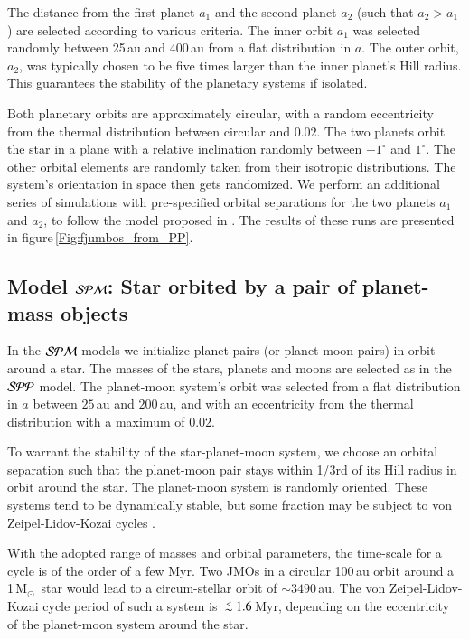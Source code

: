 \documentclass[submission,phys]{lib/SciPost}
\newcommand{\MSun}{\mbox{$\mathrm{{M}}_\odot$}}
\def\aplt{\ {\raise-.5ex\hbox{$\buildrel<\over\sim$}}\ }
\begin{document}
The distance from the first
planet $a_1$ and the second planet $a_2$ (such that $a_2>a_1$) are
selected according to various criteria.  The inner orbit $a_1$ was
selected randomly between 25\,au and $400$\,au from a flat
distribution in $a$.  The outer orbit, $a_2$, was typically chosen to
be five times larger than the inner planet's Hill radius.  This
guarantees the stability of the planetary systems if isolated.

Both planetary orbits are approximately circular, with a random eccentricity
from the thermal distribution between circular and $0.02$.  The two
planets orbit the star in a plane with a relative inclination randomly
between $-1^\circ$ and $1^\circ$. The other orbital elements are
randomly taken from their isotropic distributions.  The system's orientation 
in space then gets randomized.  We perform an
additional series of simulations with pre-specified orbital
separations for the two planets $a_1$ and $a_2$, to follow the model
proposed in \cite{2023arXiv231006016W}. The results of these runs are
presented in figure\,\ref{Fig:fjumbos_from_PP}.

\subsection{Model ${\cal SPM}$: Star orbited by a pair of planet-mass objects}

In the ${\cal SPM}$ models we initialize planet pairs (or planet-moon
pairs) in orbit around a star. The masses of the stars, planets and
moons are selected as in the ${\cal SPP}$ model.  The planet-moon
system's orbit was selected from a flat distribution in $a$ between
$25$\,au and $200$\,au, and with an eccentricity from the thermal
distribution with a maximum of $0.02$.

To warrant the stability of the star-planet-moon system, we choose an
orbital separation such that the planet-moon pair stays within 1/3rd
of its Hill radius in orbit around the star. The planet-moon system is
randomly oriented.  These systems tend to be dynamically stable, but
some fraction may be subject to von Zeipel-Lidov-Kozai cycles
\cite{1910AN....183..345V,1962PSS..9..719L,1962AJ.....67..591K}.

With the adopted range of masses and orbital parameters, the
time-scale for a cycle is of the order of a few Myr.  Two JMOs in a
circular 100\,au orbit around a 1\,\MSun\, star would lead to a
circum-stellar orbit of $\sim 3490$\,au. The von Zeipel-Lidov-Kozai
cycle period of such a system is $\aplt 1.6$\,Myr, depending on the
eccentricity of the planet-moon system around the star.
\end{document}
